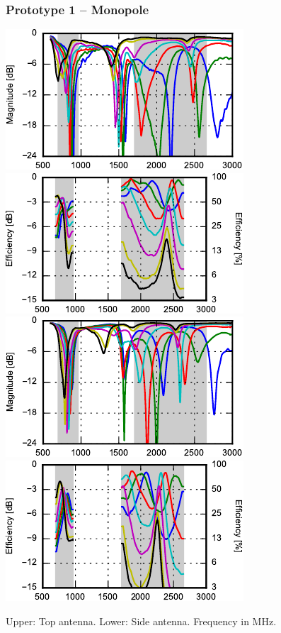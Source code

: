 \def\legendfooter{\scriptsize{Upper: Top antenna. Lower: Side antenna. Frequency in MHz.}}
\begin{frame}
    \frametitle{Prototype 1 -- Monopole}
    \emptyline
    \begin{center}
        \includegraphics{img/soren/proto/design1lt/s11.pdf}
        \includegraphics{img/soren/proto/design1lt/efftop.pdf}\\
        \includegraphics{img/soren/proto/design1lt/s22.pdf}
        \includegraphics{img/soren/proto/design1lt/effside.pdf}
    \end{center}
    \legendfooter
\end{frame}

